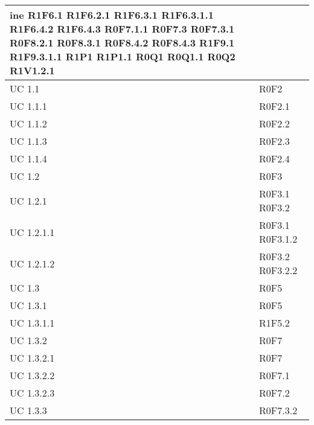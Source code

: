 \begin{center}
\begin{longtable}{| p{4cm} | p{4cm} |}
ine R1F6.1 \newline R1F6.2.1 \newline R1F6.3.1 \newline R1F6.3.1.1 \newline R1F6.4.2 \newline R1F6.4.3 \newline R0F7.1.1 \newline R0F7.3 \newline R0F7.3.1 \newline R0F8.2.1 \newline R0F8.3.1 \newline R0F8.4.2 \newline R0F8.4.3 \newline R1F9.1 \newline R1F9.3.1.1 \newline R1P1 \newline R1P1.1 \newline R0Q1 \newline R0Q1.1 \newline R0Q2 \newline R1V1.2.1 \\
		\hline
		UC 1.1  &  R0F2 \\
		\hline
		UC 1.1.1  &  R0F2.1 \\
		\hline
		UC 1.1.2  &  R0F2.2 \\
		\hline
		UC 1.1.3  &  R0F2.3 \\
		\hline
		UC 1.1.4  &  R0F2.4 \\
		\hline
		UC 1.2  &  R0F3 \\
		\hline
		UC 1.2.1  &  R0F3.1 \newline R0F3.2 \\
		\hline
		UC 1.2.1.1  &  R0F3.1 \newline R0F3.1.2 \\
		\hline
		UC 1.2.1.2  &  R0F3.2 \newline R0F3.2.2 \\
		\hline
		UC 1.3  &  R0F5 \\
		\hline
		UC 1.3.1  &  R0F5 \\
		\hline
		UC 1.3.1.1  &  R1F5.2 \\
		\hline
		UC 1.3.2  &  R0F7 \\
		\hline
		UC 1.3.2.1  &  R0F7 \\
		\hline
		UC 1.3.2.2  &  R0F7.1 \\
		\hline
		UC 1.3.2.3  &  R0F7.2 \\
		\hline
		UC 1.3.3  &  R0F7.3.2 \\

\end{longtable}
\end{center}
